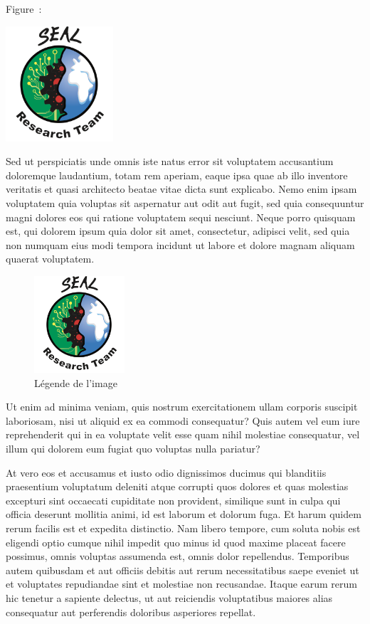 Figure~:

\includegraphics[width=0.3\textwidth]{./img/logo_equipe_robotique_exploration}

Sed ut perspiciatis unde omnis iste natus error sit voluptatem accusantium doloremque laudantium, totam rem aperiam, eaque ipsa quae ab illo inventore veritatis et quasi architecto beatae vitae dicta sunt explicabo. Nemo enim ipsam voluptatem quia voluptas sit aspernatur aut odit aut fugit, sed quia consequuntur magni dolores eos qui ratione voluptatem sequi nesciunt. Neque porro quisquam est, qui dolorem ipsum quia dolor sit amet, consectetur, adipisci velit, sed quia non numquam eius modi tempora incidunt ut labore et dolore magnam aliquam quaerat voluptatem. 

\begin{figure}
\begin{center}
	\includegraphics[width=0.3\textwidth]{./img/logo_equipe_robotique_exploration}
	\caption{Légende de l'image}
	\label{fig:image1}
\end{center}
\end{figure}

Ut enim ad minima veniam, quis nostrum exercitationem ullam corporis suscipit laboriosam, nisi ut aliquid ex ea commodi consequatur? Quis autem vel eum iure reprehenderit qui in ea voluptate velit esse quam nihil molestiae consequatur, vel illum qui dolorem eum fugiat quo voluptas nulla pariatur?

At vero eos et accusamus et iusto odio dignissimos ducimus qui blanditiis praesentium voluptatum deleniti atque corrupti quos dolores et quas molestias excepturi sint occaecati cupiditate non provident, similique sunt in culpa qui officia deserunt mollitia animi, id est laborum et dolorum fuga. Et harum quidem rerum facilis est et expedita distinctio. Nam libero tempore, cum soluta nobis est eligendi optio cumque nihil impedit quo minus id quod maxime placeat facere possimus, omnis voluptas assumenda est, omnis dolor repellendus. Temporibus autem quibusdam et aut officiis debitis aut rerum necessitatibus saepe eveniet ut et voluptates repudiandae sint et molestiae non recusandae. Itaque earum rerum hic tenetur a sapiente delectus, ut aut reiciendis voluptatibus maiores alias consequatur aut perferendis doloribus asperiores repellat.
		

